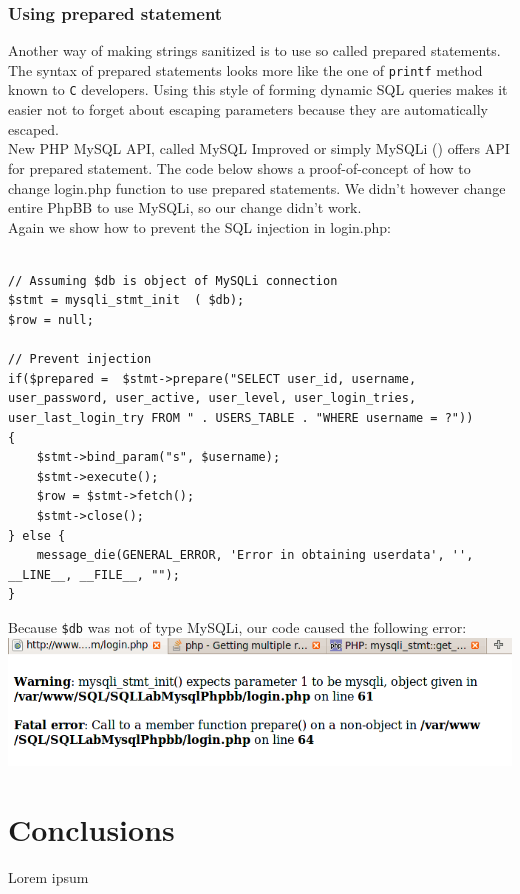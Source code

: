 \documentclass[12pt, a4paper, pdflatex]{article}
\begin{document}
\subsubsection{Using prepared statement}
Another way of making strings sanitized is to use so called prepared statements. The syntax of prepared statements looks more like the one of \texttt{printf} method known to \texttt{C} developers. Using this style of forming dynamic SQL queries makes it easier not to forget about escaping parameters because they are automatically escaped.\\

New PHP MySQL API, called MySQL Improved or simply MySQLi (\cite{mysqli}) offers API for prepared statement. The code below shows a proof-of-concept of how to change login.php function to use prepared statements. We didn't however change entire PhpBB to use MySQLi, so our change didn't work.\\

Again we show how to prevent the SQL injection in login.php:
\lstset{
	captionpos=b,
	frame=single,
	language=PHP,
	breaklines=true,
	label=sqladdslash
}
\begin{lstlisting}	

// Assuming $db is object of MySQLi connection
$stmt = mysqli_stmt_init  ( $db);
$row = null;

// Prevent injection
if($prepared =  $stmt->prepare("SELECT user_id, username, user_password, user_active, user_level, user_login_tries, user_last_login_try FROM " . USERS_TABLE . "WHERE username = ?"))
{
	$stmt->bind_param("s", $username);
	$stmt->execute();
	$row = $stmt->fetch();
	$stmt->close();
} else {
	message_die(GENERAL_ERROR, 'Error in obtaining userdata', '', __LINE__, __FILE__, "");
}
\end{lstlisting}

Because \texttt{\$db} was not of type MySQLi, our code caused the following error:\\
\includegraphics[width=.95\textwidth]{gfx/sql/mysqli.png}

\section{Conclusions}
Lorem ipsum
\end{document}
